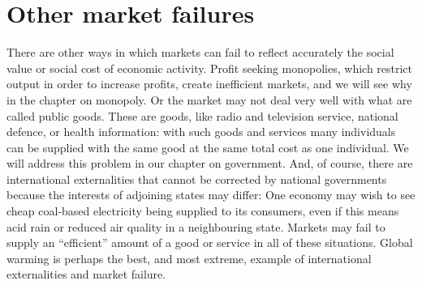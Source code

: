 \section{Other market failures}\label{sec:ch5sec6}

There are other ways in which markets can fail to reflect accurately the social value or social cost of economic activity. Profit seeking monopolies, which restrict output in order to increase profits, create inefficient markets, and we will see why in the chapter on monopoly. Or the market may not deal very well with what are called public goods. These are goods, like radio and television service, national defence, or health information: with such goods and services many individuals can be supplied with the same good at the same total cost as one individual. We will address this problem in our chapter on government. And, of course, there are international externalities that cannot be corrected by national governments because the interests of adjoining states may differ: One economy may wish to see cheap coal-based electricity being supplied to its consumers, even if this means acid rain or reduced air quality in a neighbouring state. Markets may fail to supply an ``efficient'' amount of a good or service in all of these situations. Global warming is perhaps the best, and most extreme, example of international externalities and market failure.